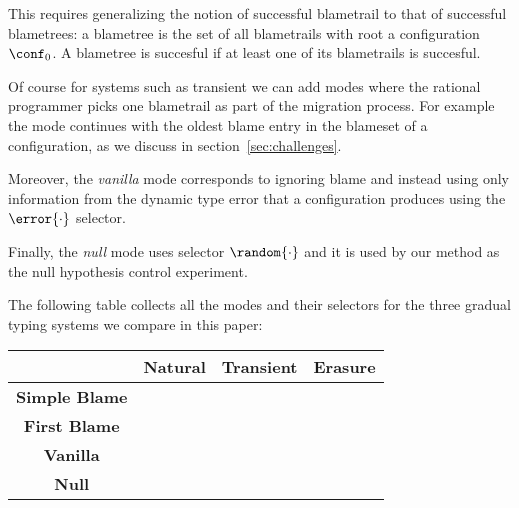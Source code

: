 This requires generalizing the notion of successful blametrail
to that of successful blametrees: a blametree is the set of all
blametrails with root a configuration $\conf_0$. A blametree is succesful if at least one
of its blametrails is succesful. 

Of course for systems such as transient we can add modes where the rational
programmer picks one blametrail as part of the migration process. For
example the \first{\blame{\cdot}} mode continues with the oldest blame
entry in the blameset of a configuration, as we discuss in
section~\ref{sec:challenges}. 

Moreover, the \emph{vanilla} mode corresponds to ignoring blame and instead
using only information from the dynamic type error that a configuration
produces using the $\error{\cdot}$ selector. 

Finally, the \emph{null} mode uses selector $\random{\cdot}$ and it is
used by our method as the null hypothesis control experiment.

The following table collects all the modes and their selectors for the
three gradual typing systems we compare in this paper:


\begin{tabular}{c|c|c|c}
                    & {\bf Natural}  & {\bf Transient}        & {\bf Erasure} \\
   \hline 
  {\bf Simple Blame}   & \blame{\conf}  & \blame{\conf}          &               \\
 {\bf First Blame}  &                 & \first{\blame{\conf}}  &               \\
  {\bf Vanilla}       &  \error{\conf} & \error{\conf}          & \error{\conf} \\
  {\bf Null}        & \random{\conf} & \random{\conf}         & \random{\conf} 
\end{tabular}  
  
